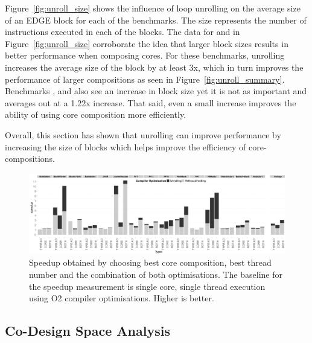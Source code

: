 Figure~\ref{fig:unroll_size} shows the influence of loop unrolling on the average size of an EDGE block for each of the benchmarks.
The size represents the number of instructions executed in each of the blocks.
The data for  and  in Figure~\ref{fig:unroll_size} corroborate the idea that larger block sizes results in better performance when composing cores.
For these benchmarks, unrolling increases the average size of the block by at least 3x, which in turn improves the performance of larger compositions as seen in Figure~\ref{fig:unroll_summary}.
Benchmarks ,  and  also see an increase in block size yet it is not as important and averages out at a 1.22x increase.
That said, even a small increase improves the ability of using core composition more efficiently.

Overall, this section has shown that unrolling can improve performance by increasing the size of blocks which helps improve the efficiency of core-compositions.

\begin{figure}[t]%
    \includegraphics[width=1\linewidth,keepaspectratio]{streamit-paper/graphics/threadcompbench.pdf}
    \caption{Speedup obtained by choosing best core composition, best
      thread number and the combination of both optimisations. The baseline for the speedup measurement is single core, single thread execution using O2 compiler optimisations. Higher
      is better.}\label{fig:overviewhist}
\end{figure}
\subsection{Co-Design Space Analysis}


